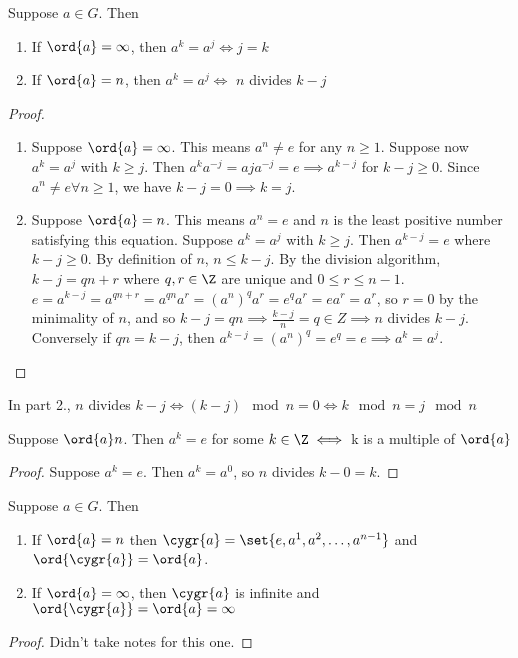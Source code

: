 \begin{theorem}
    Suppose $a \in G$. Then 
    \begin{enumerate}
        \item If $\ord{ a } = \infty$, then $a^k = a^j \iff j = k$
        \item If $\ord{ a } = n$, then $a^k = a^j \iff$ $n$ divides $k - j$
    \end{enumerate}
\end{theorem}
\begin{proof}
    \begin{enumerate}
        \item Suppose $\ord{ a } = \infty$. This means $a^n \neq e$ for any $n \geq 1$. Suppose now $a^k = a^j$ with $k \geq j$. Then $a^ka^{-j} = aja^{-j} = e \implies a^{k-j}$ for $k - j \geq 0$. Since $a^n \neq e \forall n \geq 1$, we have $k - j = 0 \implies k = j$.
        \item Suppose $\ord{ a } = n$. This means $a^n = e$ and $n$ is the least positive number satisfying this equation. Suppose $a^k = a^j$ with $k \geq j$. Then $a^{k-j} = e$ where $k - j \geq 0$. By definition of $n$, $n \leq k - j$. By the division algorithm, $k - j = qn + r$ where $q, r \in \Z$ are unique and $0 \leq r \leq n - 1$. \\
        $e = a^{k - j} = a^{qn + r} = a^{qn} a^r = \left(a^n\right)^q a^r = e^q a^r = ea^r =a^r$, so $r = 0$ by the minimality of $n$, and so $k - j = qn \implies \frac{k-j}{n} = q \in Z \implies n$ divides $k - j$.\\
        Conversely if $qn = k - j$, then $a^{k-j} = \left(a^n\right)^q = e^q = e \implies a^k = a^j$.
    \end{enumerate}
\end{proof}

\begin{remark}
    In part 2., $n$ divides $k-j \iff (k-j) \mod n = 0 \iff k \mod n = j \mod n$
\end{remark}

\begin{corollary}
    Suppose $\ord{ a } n$. Then $a^k = e$ for some $k \in \Z \iff$ k is a multiple of $\ord{ a }$
\end{corollary}
\begin{proof}
    Suppose $a^k = e$. Then $a^k = a^0$, so $n$ divides $k - 0 = k$.
\end{proof}

\begin{corollary}
    Suppose $a \in G$. Then \begin{enumerate}
        \item If $\ord{a} = n$ then $\cygr{a} = \set{e, a^1, a^2, \dots, a^{n-1}}$ and $\ord{\cygr{a}} = \ord{a}$.
        \item If $\ord{a} = \infty$, then $\cygr{a}$ is infinite and $\ord{\cygr{a}} = \ord{a} = \infty$
    \end{enumerate}
\end{corollary}
\begin{proof}
    Didn't take notes for this one.
\end{proof}

